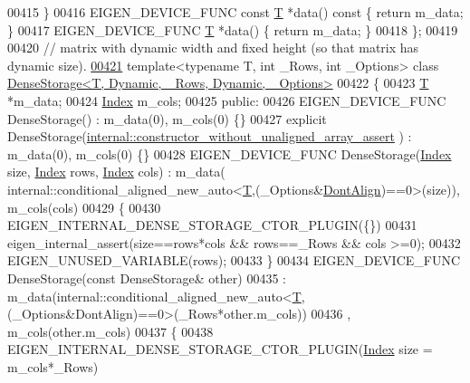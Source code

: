 \begin{DoxyCode}
00415     \}
00416     EIGEN\_DEVICE\_FUNC \textcolor{keyword}{const} \hyperlink{group___sparse_core___module}{T} *data()\textcolor{keyword}{ const }\{ \textcolor{keywordflow}{return} m\_data; \}
00417     EIGEN\_DEVICE\_FUNC \hyperlink{group___sparse_core___module}{T} *data() \{ \textcolor{keywordflow}{return} m\_data; \}
00418 \};
00419 
00420 \textcolor{comment}{// matrix with dynamic width and fixed height (so that matrix has dynamic size).}
\hyperlink{class_eigen_1_1_dense_storage_3_01_t_00_01_dynamic_00_01___rows_00_01_dynamic_00_01___options_01_4}{00421} \textcolor{keyword}{template}<\textcolor{keyword}{typename} T, \textcolor{keywordtype}{int} \_Rows, \textcolor{keywordtype}{int} \_Options> \textcolor{keyword}{class }
      \hyperlink{class_eigen_1_1_dense_storage_3_01_t_00_01_dynamic_00_01___rows_00_01_dynamic_00_01___options_01_4}{DenseStorage<T, Dynamic, \_Rows, Dynamic, \_Options>}
00422 \{
00423     \hyperlink{group___sparse_core___module}{T} *m\_data;
00424     \hyperlink{namespace_eigen_a62e77e0933482dafde8fe197d9a2cfde}{Index} m\_cols;
00425   \textcolor{keyword}{public}:
00426     EIGEN\_DEVICE\_FUNC DenseStorage() : m\_data(0), m\_cols(0) \{\}
00427     \textcolor{keyword}{explicit} DenseStorage(\hyperlink{struct_eigen_1_1internal_1_1constructor__without__unaligned__array__assert}{internal::constructor\_without\_unaligned\_array\_assert}
      ) : m\_data(0), m\_cols(0) \{\}
00428     EIGEN\_DEVICE\_FUNC DenseStorage(\hyperlink{namespace_eigen_a62e77e0933482dafde8fe197d9a2cfde}{Index} size, \hyperlink{namespace_eigen_a62e77e0933482dafde8fe197d9a2cfde}{Index} rows, \hyperlink{namespace_eigen_a62e77e0933482dafde8fe197d9a2cfde}{Index} cols) : m\_data(
      internal::conditional\_aligned\_new\_auto<\hyperlink{group___sparse_core___module}{T},(\_Options&\hyperlink{group__enums_ggaacded1a18ae58b0f554751f6cdf9eb13a40a452614141522dd313363dbbd65726}{DontAlign})==0>(size)), m\_cols(cols)
00429     \{
00430       EIGEN\_INTERNAL\_DENSE\_STORAGE\_CTOR\_PLUGIN(\{\})
00431       eigen\_internal\_assert(size==rows*cols && rows==\_Rows && cols >=0);
00432       EIGEN\_UNUSED\_VARIABLE(rows);
00433     \}
00434     EIGEN\_DEVICE\_FUNC DenseStorage(\textcolor{keyword}{const} DenseStorage& other)
00435       : m\_data(internal::conditional\_aligned\_new\_auto<\hyperlink{group___sparse_core___module}{T},(\_Options&DontAlign)==0>(\_Rows*other.m\_cols))
00436       , m\_cols(other.m\_cols)
00437     \{
00438       EIGEN\_INTERNAL\_DENSE\_STORAGE\_CTOR\_PLUGIN(\hyperlink{namespace_eigen_a62e77e0933482dafde8fe197d9a2cfde}{Index} size = m\_cols*\_Rows)

\end{DoxyCode}
